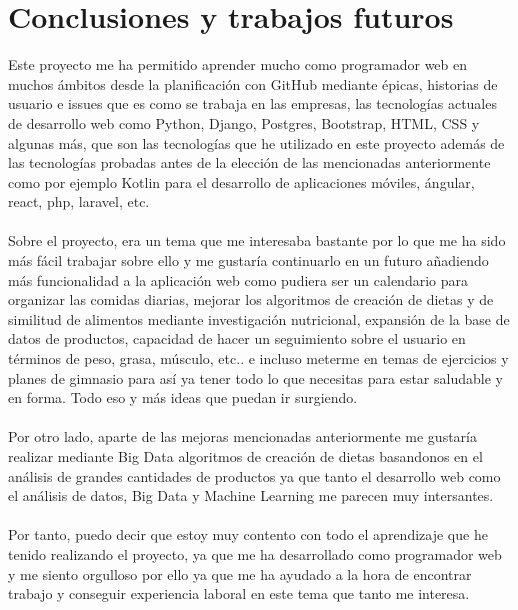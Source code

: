\chapter{Conclusiones y trabajos futuros}

Este proyecto me ha permitido aprender mucho como programador web en muchos ámbitos desde
la planificación con GitHub mediante épicas, historias de usuario e issues que es como se 
trabaja en las empresas, las tecnologías actuales de desarrollo web como Python, Django, 
Postgres, Bootstrap, HTML, CSS y algunas más, que son las tecnologías que he utilizado en 
este proyecto además de las tecnologías probadas antes de la elección de las mencionadas 
anteriormente como por ejemplo Kotlin para el desarrollo de aplicaciones móviles, ángular, 
react, php, laravel, etc.
\\\\
Sobre el proyecto, era un tema que me interesaba bastante por lo que me ha sido más fácil 
trabajar sobre ello y me gustaría continuarlo en un futuro añadiendo más funcionalidad a 
la aplicación web como pudiera ser un calendario para organizar las comidas diarias, mejorar 
los algoritmos de creación de dietas y de similitud de alimentos mediante investigación 
nutricional, expansión de la base de datos de productos, capacidad de hacer un seguimiento
sobre el usuario en términos de peso, grasa, músculo, etc.. e incluso meterme en temas de 
ejercicios y planes de gimnasio para así ya tener todo lo que necesitas para estar saludable 
y en forma. Todo eso y más ideas que puedan ir surgiendo.
\\\\
Por otro lado, aparte de las mejoras mencionadas anteriormente me gustaría realizar mediante
Big Data algoritmos de creación de dietas basandonos en el análisis de grandes cantidades de
productos ya que tanto el desarrollo web como el análisis de datos, Big Data y Machine Learning
me parecen muy intersantes.
\\\\
Por tanto, puedo decir que estoy muy contento con todo el aprendizaje que he tenido realizando 
el proyecto, ya que me ha desarrollado como programador web y me siento orgulloso por ello ya 
que me ha ayudado a la hora de encontrar trabajo y conseguir experiencia laboral en este tema 
que tanto me interesa.
